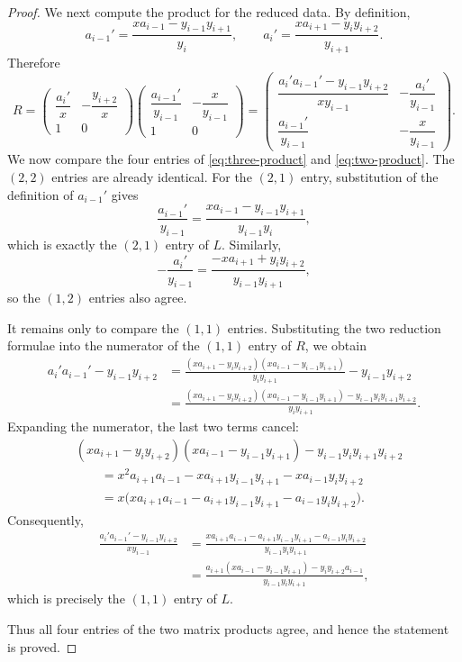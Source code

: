 \documentclass[amstex,11pt,reqno]{amsart}
\theoremstyle{definition}
\begin{document}
\begin{proof}
We next compute the product for the reduced data. By definition,
\[
 a_{i-1}'
 =
 \frac{x a_{i-1}-y_{i-1}y_{i+1}}{y_i},
 \qquad
 a_i'
 =
 \frac{x a_{i+1}-y_i y_{i+2}}{y_{i+1}}.
\]
Therefore
\begin{equation}\label{eq:two-product}
R=
\begin{pmatrix}
\dfrac{a_i'}{x}
&
-\dfrac{y_{i+2}}{x}\\[6pt]
1&0
\end{pmatrix}
\begin{pmatrix}
\dfrac{a_{i-1}'}{y_{i-1}}
&
-\dfrac{x}{y_{i-1}}\\[6pt]
1&0
\end{pmatrix}
=
\begin{pmatrix}
\dfrac{a_i'a_{i-1}'-y_{i-1}y_{i+2}}
      {x y_{i-1}}
&
-\dfrac{a_i'}{y_{i-1}}\\[10pt]
\dfrac{a_{i-1}'}{y_{i-1}}
&
-\dfrac{x}{y_{i-1}}
\end{pmatrix}.
\end{equation}
We now compare the four entries of \eqref{eq:three-product} and \eqref{eq:two-product}.  The $(2,2)$
entries are already identical.  For the $(2,1)$ entry, substitution of
the definition of $a_{i-1}'$ gives
\[
 \frac{a_{i-1}'}{y_{i-1}}
 =
 \frac{x a_{i-1}-y_{i-1}y_{i+1}}
      {y_{i-1}y_i},
\]
which is exactly the $(2,1)$ entry of $L$.  Similarly,
\[
 -\frac{a_i'}{y_{i-1}}
 =
 \frac{-x a_{i+1}+y_i y_{i+2}}
      {y_{i-1}y_{i+1}},
\]
so the $(1,2)$ entries also agree.

It remains only to compare the $(1,1)$ entries.  Substituting the two
reduction formulae into the numerator of the $(1,1)$ entry of $R$, we
obtain
\begin{align*}
a_i'a_{i-1}'-y_{i-1}y_{i+2}
&=
\frac{(x a_{i+1}-y_i y_{i+2})
      (x a_{i-1}-y_{i-1}y_{i+1})}
     {y_i y_{i+1}}
-y_{i-1}y_{i+2}\\
&=
\frac{
 (x a_{i+1}-y_i y_{i+2})
 (x a_{i-1}-y_{i-1}y_{i+1})
 -y_{i-1}y_i y_{i+1}y_{i+2}}
 {y_i y_{i+1}}.
\end{align*}
Expanding the numerator, the last two terms cancel:
\begin{align*}
& (x a_{i+1}-y_i y_{i+2})
  (x a_{i-1}-y_{i-1}y_{i+1})
  -y_{i-1}y_i y_{i+1}y_{i+2}\\
&\qquad
=
x^2a_{i+1}a_{i-1}
-xa_{i+1}y_{i-1}y_{i+1}
-xa_{i-1}y_i y_{i+2}\\
&\qquad
=
x\bigl(
x a_{i+1}a_{i-1}
-a_{i+1}y_{i-1}y_{i+1}
-a_{i-1}y_i y_{i+2}
\bigr).
\end{align*}
Consequently,
\begin{align*}
\frac{a_i'a_{i-1}'-y_{i-1}y_{i+2}}
     {x y_{i-1}}
&=
\frac{
x a_{i+1}a_{i-1}
-a_{i+1}y_{i-1}y_{i+1}
-a_{i-1}y_i y_{i+2}}
{y_{i-1}y_i y_{i+1}}\\
&=
\frac{
a_{i+1}(x a_{i-1}-y_{i-1}y_{i+1})
-y_i y_{i+2}a_{i-1}}
{y_{i-1}y_i y_{i+1}},
\end{align*}
which is precisely the $(1,1)$ entry of $L$.

Thus all four entries of the two matrix products agree, and hence the statement is proved.
\end{proof}
\end{document}
